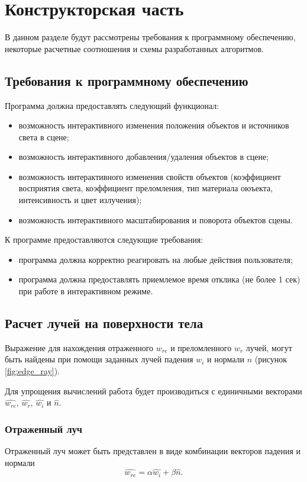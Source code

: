 \section{Конструкторская часть}
В данном разделе будут рассмотрены требования к программному обеспечению,
некоторые расчетные соотношения и схемы разработанных алгоритмов.

\subsection{Требования к программному обеспечению}
Программа должна предоставлять следующий функционал:
\begin{itemize}
    \item возможность интерактивного изменения положения объектов и источников
          света в сцене;
    \item возможность интерактивного добавления/удаления объектов в сцене;
    \item возможность интерактивного изменения свойств объектов (коэффициент
          восприятия света, коэффициент преломления, тип материала оюъекта,
          интенсивность и цвет излучения);
    \item возможность интерактивного масштабирования и поворота объектов сцены.
\end{itemize}
\vspace{\baselineskip}

К программе предоставляются следующие требования:
\begin{itemize}
    \item программа должна корректно реагировать на любые действия пользователя;
    \item программа должна предоставлять приемлемое время отклика
          (не более 1 сек) при работе в интерактивном режиме.
\end{itemize}

\subsection{Расчет лучей на поверхности тела}
Выражение для нахождения отраженного $w_{re}$ и преломленного $w_r$ лучей, могут
быть найдены при помощи заданных лучей падения $w_i$ и нормали $n$
(рисунок \ref{fig:edge_ray}).

Для упрощения вычислений работа будет производиться с единичными векторами
$\widehat{w_{re}}$, $\widehat{w_r}$, $\widehat{w_i}$ и $\widehat{n}$.

\subsubsection*{Отраженный луч}
Отраженный луч может быть представлен в виде комбинации векторов падения и
нормали
\[ \widehat{w_{re}} = \alpha \widehat{w_i} + \beta \widehat{n}. \]

